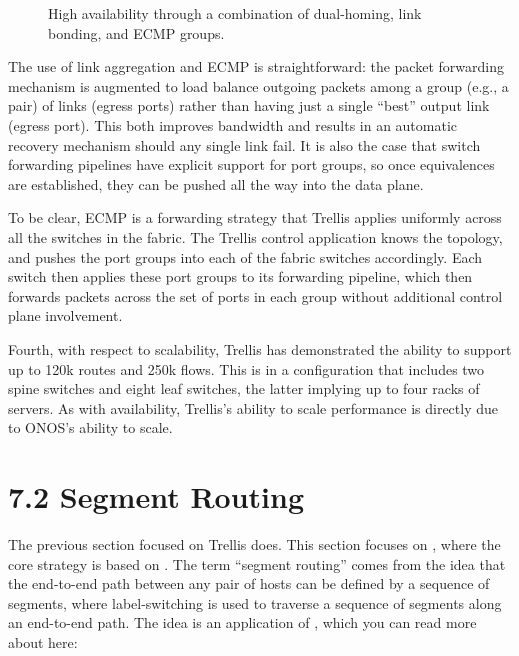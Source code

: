 \documentclass[letterpaper,11pt,english]{sphinxmanual}
\let\sphinxpxdimen\pdfpxdimen\else\newdimen\sphinxpxdimen
\begin{document}
\begin{figure}[htbp]
\centering
\capstart

\noindent\sphinxincludegraphics[width=400\sphinxpxdimen]{{Slide31}.png}
\caption{High availability through a combination of dual-homing, link
bonding, and ECMP groups.}\label{\detokenize{trellis:id1}}\label{\detokenize{trellis:fig-netconfig}}\end{figure}

The use of link aggregation and ECMP is straightforward: the packet
forwarding mechanism is augmented to load balance outgoing packets
among a group (e.g., a pair) of links (egress ports) rather than
having just a single “best” output link (egress port). This both
improves bandwidth and results in an automatic recovery mechanism
should any single link fail. It is also the case that switch
forwarding pipelines have explicit support for port groups, so once
equivalences are established, they can be pushed all the way into the
data plane.

To be clear, ECMP is a forwarding strategy that Trellis applies
uniformly across all the switches in the fabric. The Trellis control
application knows the topology, and pushes the port groups into each
of the fabric switches accordingly. Each switch then applies these
port groups to its forwarding pipeline, which then forwards packets
across the set of ports in each group without additional control plane
involvement.

Fourth, with respect to scalability, Trellis has demonstrated the
ability to support up to 120k routes and 250k flows. This is in a
configuration that includes two spine switches and eight leaf
switches, the latter implying up to four racks of servers. As with
availability, Trellis’s ability to scale performance is directly due
to ONOS’s ability to scale.


\section{7.2 Segment Routing}
\label{\detokenize{trellis:segment-routing}}
The previous section focused on  Trellis does. This section
focuses on , where the core strategy is based on . The term “segment routing” comes from the idea that the
end-to-end path between any pair of hosts can be defined by a sequence
of segments, where label-switching is used to traverse a sequence of
segments along an end-to-end path. The idea is an application of
, which you can read more about
here:
\end{document}
